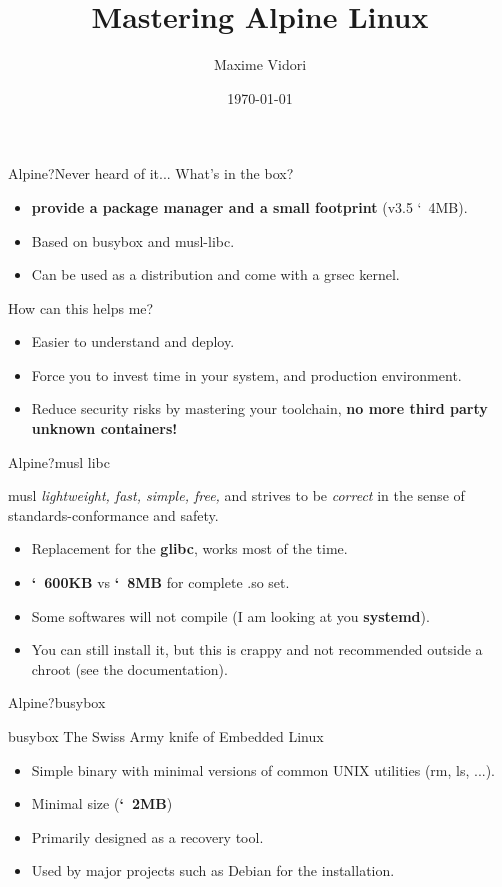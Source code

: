 \documentclass{beamer}
\title{Mastering Alpine Linux}
\date{\today}
\author{Maxime Vidori}
\begin{document}
\begin{frame}
  \titlepage
\end{frame}


\begin{frame}{Alpine?}{Never heard of it...}
  What's in the box?
  \begin{itemize}
    \item \textbf{provide a package manager and a small footprint} (v3.5 \char`~4MB).
    \item Based on busybox and musl-libc.
    \item Can be used as a distribution and come with a grsec kernel.
  \end{itemize}
  How can this helps me?
  \begin{itemize}
    \item Easier to understand and deploy.
    \item Force you to invest time in your system, and production
      environment.
    \item Reduce security risks by mastering your toolchain,
      \textbf{no more third party unknown containers!}
  \end{itemize}
\end{frame}

\begin{frame}{Alpine?}{musl libc}
  \begin{block}{musl}
    \textit{lightweight, fast, simple, free,} and strives to be
    \textit{correct} in the sense of standards-conformance and safety.
    \end{block}
  \begin{itemize}
    \item Replacement for the \textbf{glibc}, works most of the time.
    \item \textbf{\char`~600KB} vs \textbf{\char`~8MB} for complete .so set.
    \item Some softwares will not compile (I am looking at you \textbf{systemd}).
  \item You can still install it, but this is crappy and not
      recommended outside a chroot (see the documentation).
  \end{itemize}
\end{frame}

\begin{frame}{Alpine?}{busybox}
  \begin{block}{busybox}
    The Swiss Army knife of Embedded Linux
  \end{block}
  \begin{itemize}
    \item Simple binary with minimal versions of common UNIX utilities
      (rm, ls, ...).
    \item Minimal size (\textbf{\char`~2MB})
    \item Primarily designed as a recovery tool.
    \item Used by major projects such as Debian for the installation.
  \end{itemize}
\end{frame}
\end{document}
